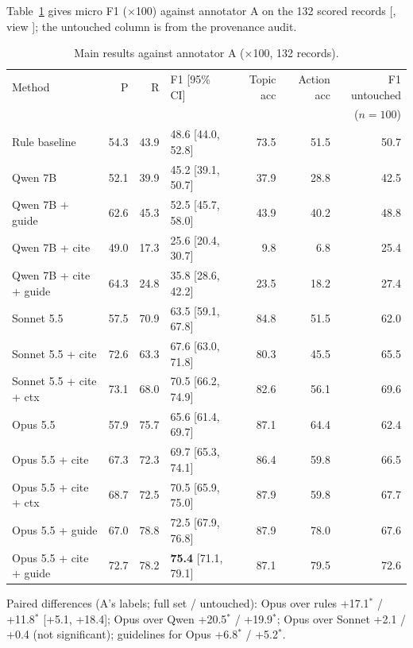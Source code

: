 \documentclass[11pt,a4paper]{article}
\newcommand{\sig}{$^{*}$}
\begin{document}
Table~\ref{tab:main} gives micro F1 ($\times$100) against annotator A on the 132 scored records {\small[, view ]}; the untouched column is from the provenance audit.

\begin{table}[h]
\centering
\small
\begin{tabular}{lrrlrrr}
\toprule
Method & P & R & F1 [95\% CI] & Topic acc & Action acc & F1 untouched \\
 & & & & & & ($n=100$) \\
\midrule
Rule baseline & 54.3 & 43.9 & 48.6 [44.0, 52.8] & 73.5 & 51.5 & 50.7 \\
\addlinespace
Qwen 7B & 52.1 & 39.9 & 45.2 [39.1, 50.7] & 37.9 & 28.8 & 42.5 \\
Qwen 7B + guide & 62.6 & 45.3 & 52.5 [45.7, 58.0] & 43.9 & 40.2 & 48.8 \\
Qwen 7B + cite & 49.0 & 17.3 & 25.6 [20.4, 30.7] & 9.8 & 6.8 & 25.4 \\
Qwen 7B + cite + guide & 64.3 & 24.8 & 35.8 [28.6, 42.2] & 23.5 & 18.2 & 27.4 \\
\addlinespace
Sonnet 5.5 & 57.5 & 70.9 & 63.5 [59.1, 67.8] & 84.8 & 51.5 & 62.0 \\
Sonnet 5.5 + cite & 72.6 & 63.3 & 67.6 [63.0, 71.8] & 80.3 & 45.5 & 65.5 \\
Sonnet 5.5 + cite + ctx & 73.1 & 68.0 & 70.5 [66.2, 74.9] & 82.6 & 56.1 & 69.6 \\
\addlinespace
Opus 5.5 & 57.9 & 75.7 & 65.6 [61.4, 69.7] & 87.1 & 64.4 & 62.4 \\
Opus 5.5 + cite & 67.3 & 72.3 & 69.7 [65.3, 74.1] & 86.4 & 59.8 & 66.5 \\
Opus 5.5 + cite + ctx & 68.7 & 72.5 & 70.5 [65.9, 75.0] & 87.9 & 59.8 & 67.7 \\
Opus 5.5 + guide & 67.0 & 78.8 & 72.5 [67.9, 76.8] & 87.9 & 78.0 & 67.6 \\
Opus 5.5 + cite + guide & 72.7 & 78.2 & \textbf{75.4} [71.1, 79.1] & 87.1 & 79.5 & 72.6 \\
\bottomrule
\end{tabular}
\caption{Main results against annotator A ($\times$100, 132 records).}
\label{tab:main}
\end{table}

Paired differences (A's labels; full set / untouched): Opus over rules +17.1\sig{} / +11.8\sig{} [+5.1, +18.4]; Opus over Qwen +20.5\sig{} / +19.9\sig; Opus over Sonnet +2.1 / +0.4 (not significant); guidelines for Opus +6.8\sig{} / +5.2\sig.
\end{document}
